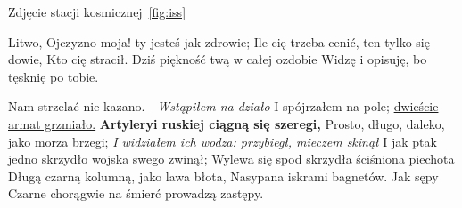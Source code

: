 Zdjęcie stacji kosmicznej~\ref{fig:iss} 



Litwo, Ojczyzno moja! ty jesteś jak zdrowie;
Ile cię trzeba cenić, ten tylko się dowie,
Kto cię stracił. Dziś piękność twą w całej ozdobie
Widzę i opisuję, bo tęsknię po tobie.\par

Nam strzelać nie kazano. - \emph{Wstąpiłem na działo}
I spójrzałem na pole; \underline{dwieście armat grzmiało.}
\textbf{Artyleryi ruskiej ciągną się szeregi,}
Prosto, długo, daleko, jako morza brzegi;
\textit{I widziałem ich wodza: przybiegł, mieczem skinął}
I jak ptak jedno skrzydło wojska swego zwinął;
Wylewa się spod skrzydła ściśniona piechota
Długą czarną kolumną, jako lawa błota,
Nasypana iskrami bagnetów. Jak sępy
Czarne chorągwie na śmierć prowadzą zastępy.
